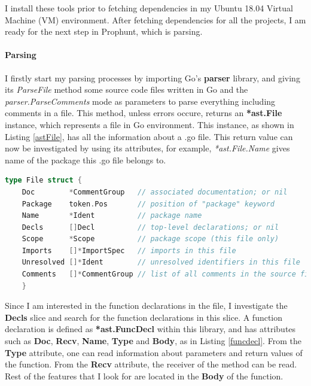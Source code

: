\documentclass{seal_thesis}
\begin{document}
\noindent I install these tools prior to fetching dependencies in my Ubuntu 18.04 Virtual Machine (VM) environment. After fetching dependencies for all the projects, I am ready for the next step in Prophunt, which is parsing.

\paragraph{Parsing}

I firstly start my parsing processes by importing Go's \textbf{parser} library, and giving its \textit{ParseFile} method some source code files written in Go and the \textit{parser.ParseComments} mode as parameters to parse everything including comments in a file. This method, unless errors occure, returns an \textbf{*ast.File} instance, which represents a file in Go environment. This instance, as shown in Listing \ref{astFile}, has all the information about a .go file. This return value can now be investigated by using its attributes, for example, \textit{*ast.File.Name} gives name of the package this .go file belongs to.

\begin{lstlisting}[caption=*ast.File declaration in Go., label={astFile}, language=Go, frame=single]
	type File struct {
	Doc        *CommentGroup   // associated documentation; or nil
	Package    token.Pos       // position of "package" keyword
	Name       *Ident          // package name
	Decls      []Decl          // top-level declarations; or nil
	Scope      *Scope          // package scope (this file only)
	Imports    []*ImportSpec   // imports in this file
	Unresolved []*Ident        // unresolved identifiers in this file
	Comments   []*CommentGroup // list of all comments in the source file
	}
\end{lstlisting}

\noindent Since I am interested in the function declarations in the file, I investigate the \textbf{Decls} slice and search for the function declarations in this slice. A function declaration is defined as \textbf{*ast.FuncDecl} within this library, and has attributes such as \textbf{Doc}, \textbf{Recv}, \textbf{Name}, \textbf{Type} and \textbf{Body}, as in Listing \ref{funcdecl}. From the \textbf{Type} attribute, one can read information about parameters and return values of the function. From the \textbf{Recv} attribute, the receiver of the method can be read. Rest of the features that I look for are located in the \textbf{Body} of the function.
\end{document}
